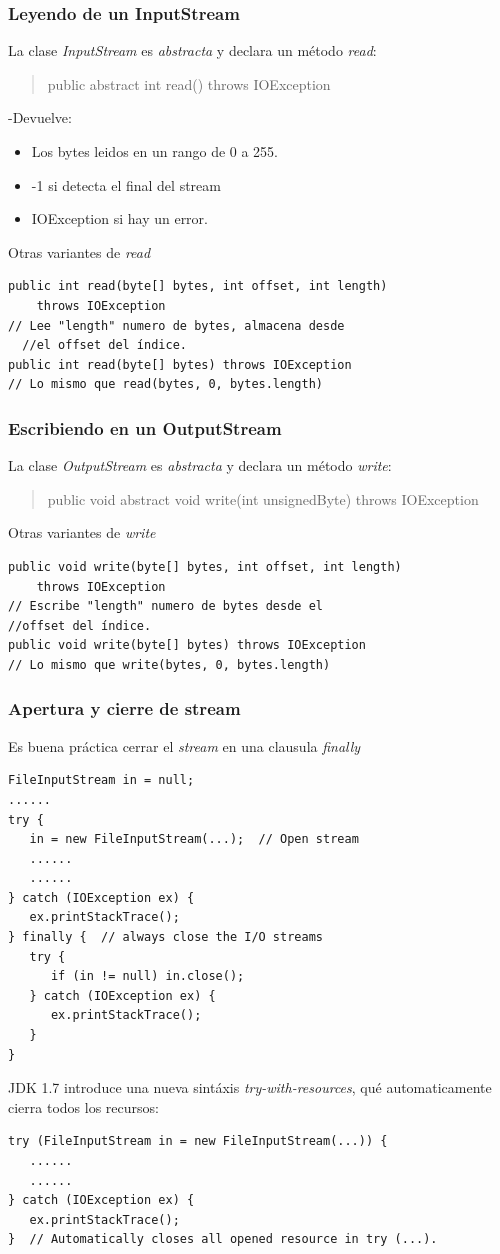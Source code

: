 \documentclass{beamer}
\begin{document}
\begin{frame}[fragile]
\frametitle{Leyendo de un InputStream}
La clase \emph{InputStream} es \emph{abstracta} y declara un método \emph{read}:
\begin{quote}
public abstract int read() throws IOException
\end{quote}
\pause
-Devuelve: 
\begin{itemize}[<+->]
\item Los bytes leidos en un rango de 0 a 255.
\item \alert{-1} si detecta el final del stream
\item IOException si hay un error.
\end{itemize}
\pause
Otras variantes de \emph{read}
\begin{verbatim}
public int read(byte[] bytes, int offset, int length) 
    throws IOException
// Lee "length" numero de bytes, almacena desde 
  //el offset del índice.
public int read(byte[] bytes) throws IOException
// Lo mismo que read(bytes, 0, bytes.length)
\end{verbatim}
\end{frame}


\begin{frame}[fragile]
\frametitle{Escribiendo en un OutputStream}
La clase \emph{OutputStream} es \emph{abstracta} y declara un método \emph{write}:
\begin{quote}
public void abstract void write(int unsignedByte)
 throws IOException
\end{quote}
\pause
Otras variantes de \emph{write}
\begin{verbatim}
public void write(byte[] bytes, int offset, int length)
    throws IOException
// Escribe "length" numero de bytes desde el 
//offset del índice.
public void write(byte[] bytes) throws IOException
// Lo mismo que write(bytes, 0, bytes.length)
\end{verbatim}
\end{frame}

\begin{frame}[fragile]
\frametitle{Apertura y cierre de stream}
\begin{small}
Es buena práctica cerrar el \emph{stream} en una clausula \emph{finally}
\begin{verbatim}
FileInputStream in = null;
......  
try {
   in = new FileInputStream(...);  // Open stream
   ......
   ......
} catch (IOException ex) {
   ex.printStackTrace();
} finally {  // always close the I/O streams
   try {
      if (in != null) in.close();
   } catch (IOException ex) {
      ex.printStackTrace();
   }
}
\end{verbatim}
\pause
JDK 1.7 introduce una nueva sintáxis \emph{try-with-resources}, qué automaticamente cierra todos los recursos:
\begin{verbatim}
try (FileInputStream in = new FileInputStream(...)) {
   ......
   ......
} catch (IOException ex) {
   ex.printStackTrace();
}  // Automatically closes all opened resource in try (...).
\end{verbatim} 
\end{small}
\end{frame}
\end{document}
